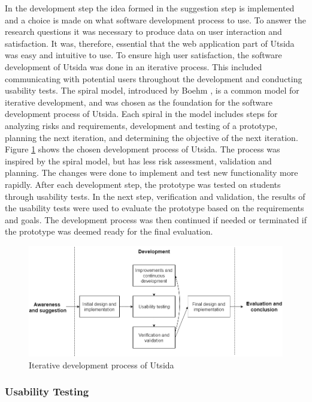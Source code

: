 In the development step the idea formed in the suggestion step is implemented and a choice is made on what software development process to use. To answer the research questions it was necessary to produce data on user interaction and satisfaction. It was, therefore, essential that the web application part of Utsida was easy and intuitive to use. To ensure high user satisfaction, the software development of Utsida was done in an iterative process. This included communicating with potential users throughout the development and conducting usability tests. The spiral model, introduced by Boehm \cite{boehm1988spiral}, is a common model for iterative development, and was chosen as the foundation for the software development process of Utsida. Each spiral in the model includes steps for analyzing risks and requirements, development and testing of a prototype, planning the next iteration, and determining the objective of the next iteration. Figure \ref{fig:development_process} shows the chosen development process of Utsida. The process was inspired by the spiral model, but has less risk assessment, validation and planning. The changes were done to implement and test new functionality more rapidly. After each development step, the prototype was tested on students through usability tests. In the next step, verification and validation, the results of the usability tests were used to evaluate the prototype based on the requirements and goals. The development process was then continued if needed or terminated if the prototype was deemed ready for the final evaluation.

\begin{figure}[h]
    \centering
    \includegraphics[width=1\textwidth]{fig/research_process_2.png}
    \caption[Development process]{Iterative development process of Utsida}
    \label{fig:development_process}
\end{figure}

\subsubsection{Usability Testing}

